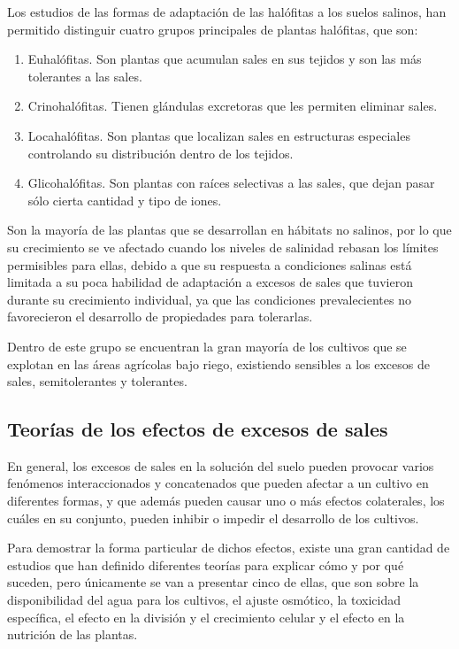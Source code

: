 Los estudios de las formas de adaptación de las halófitas a los suelos salinos, han permitido distinguir cuatro grupos principales de plantas halófitas, que son:
\begin{enumerate}
    \item Euhalófitas. Son plantas que acumulan sales en sus tejidos y son las más tolerantes a las sales.
    \item Crinohalófitas. Tienen glándulas excretoras que les permiten eliminar sales.
    \item Locahalófitas. Son plantas que localizan sales en estructuras especiales controlando su distribución dentro de los tejidos.
    \item Glicohalófitas. Son plantas con raíces selectivas a las sales, que dejan pasar sólo cierta cantidad y tipo de iones.    
\end{enumerate}

\begin{definition}[Glicófitas]
    Son la mayoría de las plantas que se desarrollan en hábitats no salinos, por lo que su crecimiento se ve afectado cuando los niveles de salinidad rebasan los límites permisibles para ellas, debido a que su respuesta a condiciones salinas está limitada a su poca habilidad de adaptación a excesos de sales que tuvieron durante su crecimiento individual, ya que las condiciones prevalecientes no favorecieron el desarrollo de propiedades para tolerarlas.
\end{definition}
Dentro de este grupo se encuentran la gran mayoría de los cultivos que se explotan en las áreas agrícolas bajo riego, existiendo sensibles a los excesos de sales, semitolerantes y tolerantes.
\subsection{Teorías de los efectos de excesos de sales}
En general, los excesos de sales en la solución del suelo pueden provocar varios fenómenos interaccionados y concatenados que pueden afectar a un cultivo en diferentes formas, y que además pueden causar uno o más efectos colaterales, los cuáles en su conjunto, pueden inhibir o impedir el desarrollo de los cultivos.

Para demostrar la forma particular de dichos efectos, existe una gran cantidad de estudios que han definido diferentes teorías para explicar cómo y por qué suceden, pero únicamente se van a presentar cinco de ellas, que son sobre la disponibilidad del agua para los cultivos, el ajuste osmótico, la toxicidad específica, el efecto en la división y el crecimiento celular y el efecto en la nutrición de las plantas.

